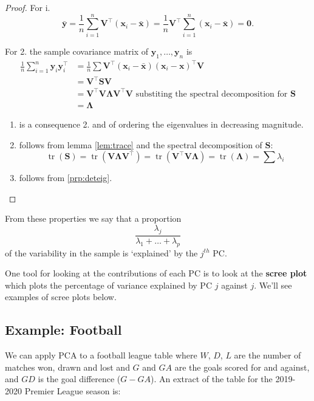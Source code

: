 \documentclass[]{book}
\theoremstyle{definition}
\theoremstyle{definition}
\theoremstyle{definition}
\theoremstyle{remark}
\begin{document}
\begin{proof}
{}For i.
\[\bar{\mathbf y} = \frac{1}{n}\sum_{i=1}^n \mathbf V^\top(\mathbf x_i-\bar{\mathbf x}) = \frac{1}{n} \mathbf V^\top\sum_{i=1}^n(\mathbf x_i-\bar{\mathbf x}) =\boldsymbol 0.\]

For 2. the sample covariance matrix of \(\mathbf y_1, \ldots, \mathbf y_n\) is
\begin{align*}
\frac{1}{n}\sum_{i=1}^n \mathbf y_i \mathbf y_i^\top &=\frac{1}{n} \sum \mathbf V^\top (\mathbf x_i-\bar{\mathbf x})(\mathbf x_i - \mathbf x)^\top \mathbf V\\
&=\mathbf V^\top \mathbf S\mathbf V\\
&=\mathbf V^\top \mathbf V\boldsymbol \Lambda\mathbf V^\top \mathbf V\mbox{ substiting the spectral decomposition for }\mathbf S\\
&=\boldsymbol \Lambda
\end{align*}

\begin{enumerate}
\def\labelenumi{\arabic{enumi}.}
\setcounter{enumi}{2}
\item
  is a consequence 2. and of ordering the eigenvalues in decreasing magnitude.
\item
  follows from lemma \ref{lem:trace} and the spectral decomposition of \(\mathbf S\):
  \[\operatorname{tr}(\mathbf S) = \operatorname{tr}(\mathbf V\boldsymbol \Lambda\mathbf V^\top)  =\operatorname{tr}(\mathbf V^\top \mathbf V\boldsymbol \Lambda)=\operatorname{tr}(\boldsymbol \Lambda)=\sum\lambda_i\]
\item
  follows from \ref{prp:deteig}.
\end{enumerate}
\end{proof}

From these properties we say that a proportion
\[\frac{\lambda_j}{\lambda_1 + \ldots + \lambda_p}\]
of the variability in the sample is `explained' by the \(j^{th}\) PC.

One tool for looking at the contributions of each PC is to look at the \textbf{scree plot} which plots the percentage of variance explained by PC \(j\) against \(j\). We'll see examples of scree plots below.

\hypertarget{pca:football}{%
\subsection{Example: Football}\label{pca:football}}

We can apply PCA to a football league table where \(W\), \(D\), \(L\) are the number of matches won, drawn and lost and \(G\) and \(GA\) are the goals scored for and against, and \(GD\) is the goal difference (\(G-GA\)). An extract of the table for the 2019-2020 Premier League season is:
\end{document}
